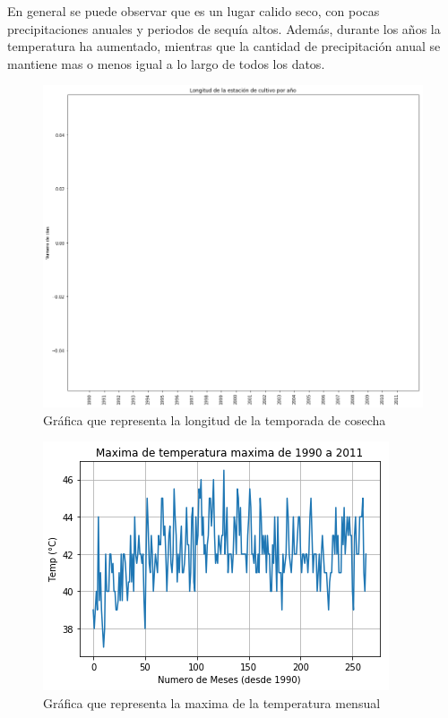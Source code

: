 \documentclass[12pt]{article}
\begin{document}
 En general se puede observar que es un lugar calido seco, con pocas precipitaciones anuales y periodos de sequía altos. Además, durante los años la temperatura ha aumentado, mientras que la cantidad de precipitación anual se mantiene mas o menos igual a lo largo de todos los datos.
 
 \begin{figure}
    \centering
    \includegraphics[scale= .25]{indice4.png}
    \caption{Gráfica que representa la longitud de la temporada de cosecha}
    \label{fig:indice4}
\end{figure}
\begin{figure}
    \centering
    \includegraphics[scale=.8]{indice5.png}
    \caption{Gráfica que representa la maxima de la temperatura mensual}
    \label{fig:indice5}
\end{figure}
\end{document}
